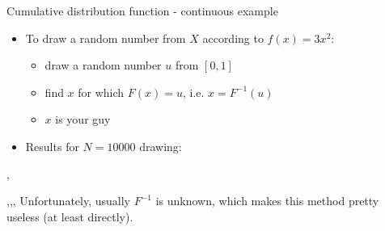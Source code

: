 \begin{slide}[toc=]{Cumulative distribution function - continuous example}
\null\vfill

 \begin{itemize}
  \item To draw a random number from $X$ according to $f(x) = 3x^2$:
  \begin{itemize}
    \item draw a random number $u$ from $[0, 1]$
    \item find $x$ for which $F (x) = u$, i.e. $x = F^{-1}(u)$
    \item $x$ is your guy
  \end{itemize}
  \item Results for $N = 10000$ drawing:
 \end{itemize}
  \sep
 \twocolumn
 {
  
 }
 {
  \sep\sep\sep
  Unfortunately, usually $F^{-1}$ is unknown, which makes this method pretty useless (at least directly).
 }
\vfill\null
\end{slide}